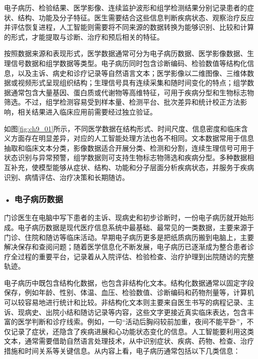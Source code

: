 电子病历、检验结果、医学影像、连续监护波形和组学检测结果分别记录患者的症状、结构、功能及分子特征。医生需要结合这些信息判断疾病状态、观察治疗反应并评估恢复进程，人工智能则需要将不同来源的数据转换为能够识别、比较和计算的形式，才能提取与诊断、治疗和预后相关的特征。

按照数据来源和表现形式，医学数据通常可分为电子病历数据、医学影像数据、生理信号数据和组学数据等类型。电子病历同时包含诊断编码、检验数值等结构化信息，以及主诉、病史和诊疗记录等自然语言文本；医学影像以二维图像、三维体数据或视频形式呈现组织结构；生理信号具有连续采集和随时间变化的特点；组学数据通常包含大量基因、蛋白质或代谢物等高维特征，可用于疾病分型和生物标志物筛选。不过，组学检测容易受到样本量、检测平台、批次差异和统计校正方法影响，相关结果进入临床应用前需要经过独立验证。

如图\ref{fig:ch9_01}所示，不同医学数据在结构形式、时间尺度、信息密度和临床含义方面存在明显差异，对应的人工智能处理方法也各不相同。文本数据常用于信息抽取和临床文本分类，影像数据适合开展分类、检测和分割，连续生理信号可用于状态识别与异常预警，组学数据则可支持生物标志物筛选和疾病分型。多种数据相互补充，使模型能够从症状、结构、功能和分子层面分析疾病状态，并服务于疾病识别、病情评估、治疗决策和长期随访。


\par
\noindent\begin{minipage}{\textwidth}
\centering
{}
\label{fig:ch9_01}
\end{minipage}
\par

\subsubsection*{\textbf{• 电子病历数据}}
门诊医生在电脑中写下患者的主诉、现病史和初步诊断时，一份电子病历就开始形成。电子病历数据是现代医疗信息系统中最基础、最常见的一类数据，主要来源于门诊、住院和随访等临床活动。早期电子病历更多是把纸质病历搬到电脑上，主要解决保存和查阅问题；随着医学信息化不断发展，电子病历已逐渐成为整合患者诊疗全过程的重要平台，记录着从入院评估、检验检查、治疗护理到出院随访的完整轨迹。

电子病历中既包含结构化数据，也包含非结构化文本。结构化数据通常以固定字段保存，例如年龄、性别、体温、血压、检验数值、诊断编码和药物剂量等，计算机可以较容易地进行统计和比较。非结构化文本则主要来自医生书写的病程记录、主诉、现病史、出院小结和随访记录等内容，这些文字更接近真实临床表达，包含丰富的医学判断和诊疗线索。例如，一句“活动后胸闷较前加重，夜间不能平卧”，不仅记录了症状，还隐含了疾病进展和心功能状态变化的信息。人工智能要利用这类文本，通常需要借助自然语言处理技术，从中识别症状、疾病、药物、检查、治疗措施和时间关系等关键信息。从内容上看，电子病历通常包括以下几类信息：

